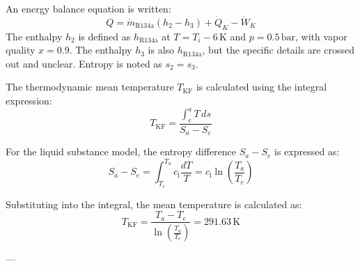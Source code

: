 An energy balance equation is written:  
\[
Q = \dot{m}_{\text{R134a}} \left( h_2 - h_3 \right) + \dot{Q}_K - \dot{W}_K
\]  
The enthalpy \( h_2 \) is defined as \( h_{\text{R134a}} \) at \( T = T_i - 6 \, \text{K} \) and \( p = 0.5 \, \text{bar} \), with vapor quality \( x = 0.9 \).  
The enthalpy \( h_3 \) is also \( h_{\text{R134a}} \), but the specific details are crossed out and unclear.  
Entropy is noted as \( s_2 = s_3 \).

The thermodynamic mean temperature \( T_{\text{KF}} \) is calculated using the integral expression:  
\[
T_{\text{KF}} = \frac{\int_{e}^{a} T \, ds}{S_a - S_e}
\]  

For the liquid substance model, the entropy difference \( S_a - S_e \) is expressed as:  
\[
S_a - S_e = \int_{T_e}^{T_a} c_{\text{l}} \frac{dT}{T} = c_{\text{l}} \ln \left( \frac{T_a}{T_e} \right)
\]  

Substituting into the integral, the mean temperature is calculated as:  
\[
T_{\text{KF}} = \frac{T_a - T_e}{\ln \left( \frac{T_a}{T_e} \right)} = 291.63 \, \text{K}
\]  

---